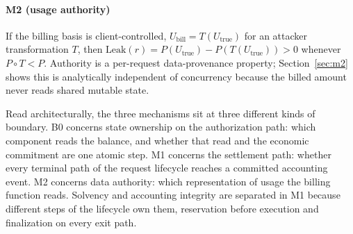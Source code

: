 \documentclass[manuscript,review,anonymous]{acmart}
\begin{document}
\paragraph{M2 (usage authority)}
If the billing basis is client-controlled, $U_{\text{bill}} = T(U_{\text{true}})$ for an
attacker transformation $T$, then $\mathrm{Leak}(r) = P(U_{\text{true}}) -
P(T(U_{\text{true}})) > 0$ whenever $P \circ T < P$. Authority is a per-request
data-provenance property; Section~\ref{sec:m2} shows this is analytically independent of
concurrency because the billed amount never reads shared mutable state.

\begin{table}[t]
\centering
\caption{Structural distinction between the three mechanisms: what is defective, what
triggers the baseline manifestation we implemented, and what closes it. ``Trigger'' is
implementation-specific; the general condition (final column of Table~\ref{tab:practical})
is what actually matters and is not concurrency-specific for any of the three.}
\label{tab:structural}
\end{table}

Read architecturally, the three mechanisms sit at three different kinds of boundary. B0
concerns state ownership on the authorization path: which component reads the balance,
and whether that read and the economic commitment are one atomic step. M1 concerns the
settlement path: whether every terminal path of the request lifecycle reaches a committed
accounting event. M2 concerns data authority: which representation of usage the billing
function reads. Solvency and accounting integrity are separated in M1 because different
steps of the lifecycle own them, reservation before execution and finalization on every
exit path.
\end{document}
